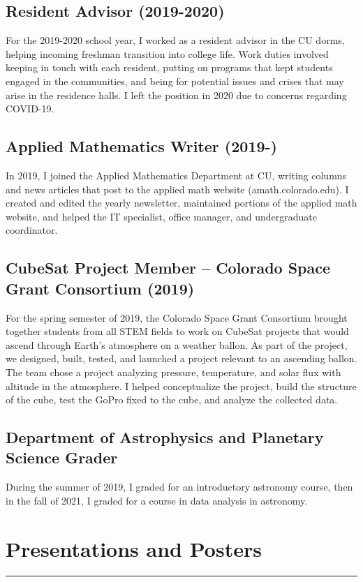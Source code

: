 \documentclass{article}
\newcommand{\divider}{\vskip-2pt\hrule\vskip4pt}
\begin{document}
\subsection{Resident Advisor (2019-2020)}
For the 2019-2020 school year, I worked as a resident advisor in the CU dorms, helping incoming freshman transition into college life. Work duties involved keeping in touch with each resident, putting on programs that kept students engaged in the communities, and being  for potential issues and crises that may arise in the residence halls. I left the position in 2020 due to concerns regarding COVID-19.

\subsection{Applied Mathematics Writer (2019-)}
In 2019, I joined the Applied Mathematics Department at CU, writing columns and news articles that post to the applied math website (amath.colorado.edu). I created and edited the yearly newsletter, maintained portions of the applied math website, and helped the IT specialist, office manager, and undergraduate coordinator. 

\subsection{CubeSat Project Member -- Colorado Space Grant Consortium (2019)}
For the spring semester of 2019, the Colorado Space Grant Consortium brought together students from all STEM fields to work on CubeSat projects that would ascend through Earth's atmosphere on a weather ballon. As part of the project, we designed, built, tested, and launched a project relevant to an ascending ballon. The team chose a project analyzing pressure, temperature, and solar flux with altitude in the atmosphere. I helped conceptualize the project, build the structure of the cube, test the GoPro fixed to the cube, and analyze the collected data. 

\subsection{Department of Astrophysics and Planetary Science Grader}
During the summer of 2019, I graded for an introductory astronomy course, then in the fall of 2021, I graded for a course in data analysis in astronomy.

\section{Presentations and Posters}
\divider
\end{document}
